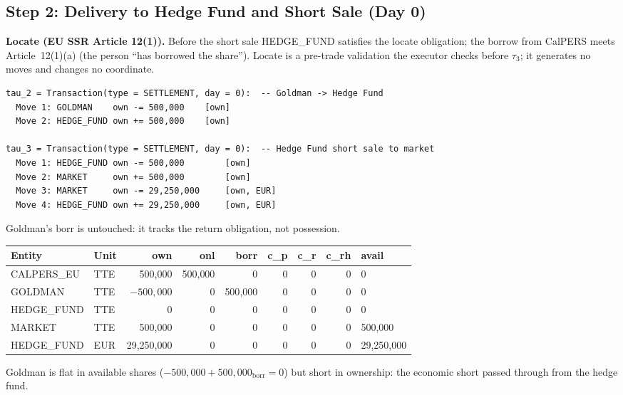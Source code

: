 \documentclass[11pt,a4paper]{article}
\begin{document}
\subsection{Step 2: Delivery to Hedge Fund and Short Sale (Day 0)}
\label{sec:eu-step2}

\textbf{Locate (EU SSR Article 12(1)).} Before the short sale HEDGE\_FUND satisfies the locate obligation; the borrow from CalPERS meets Article~12(1)(a) (the person ``has borrowed the share''). Locate is a pre-trade validation the executor checks before $\tau_3$; it generates no moves and changes no coordinate.

\begin{lstlisting}
tau_2 = Transaction(type = SETTLEMENT, day = 0):  -- Goldman -> Hedge Fund
  Move 1: GOLDMAN    own -= 500,000    [own]
  Move 2: HEDGE_FUND own += 500,000    [own]

tau_3 = Transaction(type = SETTLEMENT, day = 0):  -- Hedge Fund short sale to market
  Move 1: HEDGE_FUND own -= 500,000        [own]
  Move 2: MARKET     own += 500,000        [own]
  Move 3: MARKET     own -= 29,250,000     [own, EUR]
  Move 4: HEDGE_FUND own += 29,250,000     [own, EUR]
\end{lstlisting}

\noindent Goldman's $\mathrm{borr}$ is untouched: it tracks the return obligation, not possession.

\begin{center}\small
\begin{tabular}{l l r r r r r r l}
\toprule
\textbf{Entity} & \textbf{Unit} & own & onl & borr & c\_p & c\_r & c\_rh & avail \\
\midrule
CALPERS\_EU & TTE & 500{,}000 & 500{,}000 & 0 & 0 & 0 & 0 & 0 \\
GOLDMAN & TTE & $-500{,}000$ & 0 & 500{,}000 & 0 & 0 & 0 & 0 \\
HEDGE\_FUND & TTE & 0 & 0 & 0 & 0 & 0 & 0 & 0 \\
MARKET & TTE & 500{,}000 & 0 & 0 & 0 & 0 & 0 & 500{,}000 \\
HEDGE\_FUND & EUR & 29{,}250{,}000 & 0 & 0 & 0 & 0 & 0 & 29{,}250{,}000 \\
\bottomrule
\end{tabular}
\end{center}

\noindent Goldman is flat in available shares ($-500{,}000 + 500{,}000_{\mathrm{borr}} = 0$) but short in ownership: the economic short passed through from the hedge fund.
\end{document}
